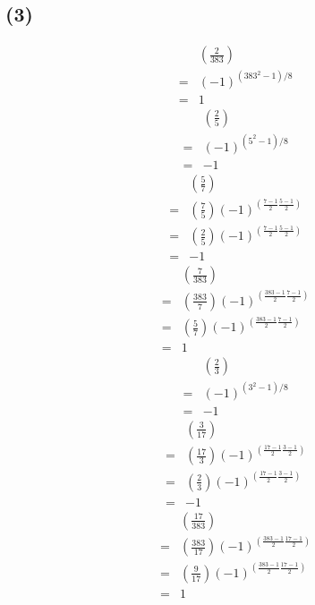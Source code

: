 \documentclass{article}
\begin{document}
\subsection*{(3)}
\begin{eqnarray*}
  & & \left(\frac{2}{383}\right) \\
  &=& (-1)^{(383^2 - 1)/8} \\
  &=& 1
\end{eqnarray*}
\begin{eqnarray*}
  & & \left(\frac{2}{5}\right) \\
  &=& (-1)^{(5^2 - 1)/8} \\
  &=& -1
\end{eqnarray*}
\begin{eqnarray*}
  & &  \left(\frac{5}{7}\right) \\
  &=& \left(\frac{7}{5}\right) (-1)^{(\frac{7-1}{2}\frac{5-1}{2})} \\
  &=& \left(\frac{2}{5}\right) (-1)^{(\frac{7-1}{2}\frac{5-1}{2})} \\
  &=& -1
\end{eqnarray*}
\begin{eqnarray*}
  & &  \left(\frac{7}{383}\right) \\
  &=& \left(\frac{383}{7}\right) (-1)^{(\frac{383-1}{2}\frac{7-1}{2})} \\
  &=& \left(\frac{5}{7}\right) (-1)^{(\frac{383-1}{2}\frac{7-1}{2})} \\
  &=& 1
\end{eqnarray*}
\begin{eqnarray*}
  & & \left(\frac{2}{3}\right) \\
  &=& (-1)^{(3^2 - 1)/8} \\
  &=& -1
\end{eqnarray*}
\begin{eqnarray*}
  & &  \left(\frac{3}{17}\right) \\
  &=& \left(\frac{17}{3}\right) (-1)^{(\frac{17-1}{2}\frac{3-1}{2})} \\
  &=& \left(\frac{2}{3}\right) (-1)^{(\frac{17-1}{2}\frac{3-1}{2})} \\
  &=& -1
\end{eqnarray*}
\begin{eqnarray*}
  & &  \left(\frac{17}{383}\right) \\
  &=& \left(\frac{383}{17}\right) (-1)^{(\frac{383-1}{2}\frac{17-1}{2})} \\
  &=& \left(\frac{9}{17}\right) (-1)^{(\frac{383-1}{2}\frac{17-1}{2})} \\
  &=& 1
\end{eqnarray*}
\end{document}
